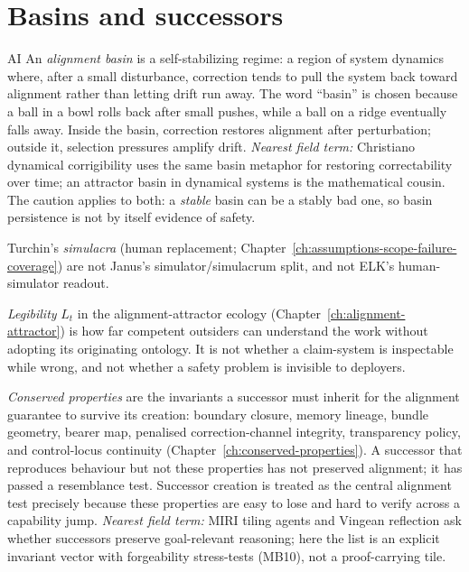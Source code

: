\section*{Basins and successors}
\begin{authbar}{AI}
An \emph{alignment basin} is a self-stabilizing regime: a region of system dynamics where, after a small disturbance, correction tends to pull the system back toward alignment rather than letting drift run away.
The word ``basin'' is chosen because a ball in a bowl rolls back after small pushes, while a ball on a ridge eventually falls away.
Inside the basin, correction restores alignment after perturbation; outside it, selection pressures amplify drift.
\emph{Nearest field term:} Christiano dynamical corrigibility uses the same basin metaphor for restoring correctability over time; an attractor basin in dynamical systems is the mathematical cousin.
The caution applies to both: a \emph{stable} basin can be a stably bad one, so basin persistence is not by itself evidence of safety.

Turchin's \emph{simulacra} (human replacement; Chapter~\ref{ch:assumptions-scope-failure-coverage}) are not Janus's simulator/simulacrum split, and not ELK's human-simulator readout.

\emph{Legibility} \(L_t\) in the alignment-attractor ecology (Chapter~\ref{ch:alignment-attractor}) is how far competent outsiders can understand the work without adopting its originating ontology.
It is not whether a claim-system is inspectable while wrong, and not whether a safety problem is invisible to deployers.

\emph{Conserved properties} are the invariants a successor must inherit for the alignment guarantee to survive its creation: boundary closure, memory lineage, bundle geometry, bearer map, penalised correction-channel integrity, transparency policy, and control-locus continuity (Chapter~\ref{ch:conserved-properties}).
A successor that reproduces behaviour but not these properties has not preserved alignment; it has passed a resemblance test.
Successor creation is treated as the central alignment test precisely because these properties are easy to lose and hard to verify across a capability jump.
\emph{Nearest field term:} MIRI tiling agents and Vingean reflection ask whether successors preserve goal-relevant reasoning; here the list is an explicit invariant vector with forgeability stress-tests (MB10), not a proof-carrying tile.
\end{authbar}
